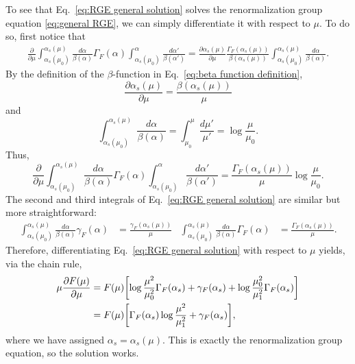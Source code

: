 \documentclass[12pt,twoside,class=../reedthesis, crop=false]{standalone}
\begin{document}
	To see that Eq.~\ref{eq:RGE general solution} solves the renormalization group equation \ref{eq:general RGE}, we can simply differentiate it with respect to $\mu$. To do so, first notice that
	\begin{equation}
	\begin{aligned}
		\frac{\partial}{\partial \mu} \int_{\alpha_s(\mu_0)}^{\alpha_s(\mu)} \frac{d\alpha}{\beta(\alpha)}\Gamma_F(\alpha) \int_{\alpha_s(\mu_0)}^\alpha \frac{d\alpha'}{\beta(\alpha')} = \frac{\partial \alpha_s(\mu)}{\partial \mu} \frac{\Gamma_F(\alpha_s(\mu))}{\beta(\alpha_s(\mu))} \int_{\alpha_s(\mu_0)}^{\alpha_s(\mu)} \frac{d\alpha}{\beta(\alpha)}.
	\end{aligned}
	\end{equation}
	By the definition of the $\beta$-function in Eq.~\ref{eq:beta function definition},
	\begin{equation}
		\frac{\partial \alpha_s(\mu)}{\partial \mu} = \frac{\beta(\alpha_s(\mu))}{\mu}
	\end{equation}
	and
	\begin{equation}
		\int_{\alpha_s(\mu_0)}^{\alpha_s(\mu)} \frac{d\alpha}{\beta(\alpha)} = \int_{\mu_0}^\mu \frac{d\mu'}{\mu'} = \log\frac{\mu}{\mu_0}.
	\end{equation}
	Thus,
	\begin{equation}
		\frac{\partial}{\partial \mu} \int_{\alpha_s(\mu_0)}^{\alpha_s(\mu)} \frac{d\alpha}{\beta(\alpha)}\Gamma_F(\alpha) \int_{\alpha_s(\mu_0)}^\alpha \frac{d\alpha'}{\beta(\alpha')} = \frac{\Gamma_F(\alpha_s(\mu))}{\mu} \log \frac{\mu}{\mu_0}.
	\end{equation}
	The second and third integrals of Eq.~\ref{eq:RGE general solution} are similar but more straightforward:
	\begin{align}
		\int_{\alpha_s(\mu_0)}^{\alpha_s(\mu)} \frac{d\alpha}{\beta(\alpha)}\gamma_F(\alpha) &= \frac{\gamma_F(\alpha_s(\mu))}{\mu} & \int_{\alpha_s(\mu_0)}^{\alpha_s(\mu)} \frac{d\alpha}{\beta(\alpha)}\Gamma_F(\alpha) &= \frac{\Gamma_F(\alpha_s(\mu))}{\mu}.
	\end{align}
	Therefore, differentiating Eq.~\ref{eq:RGE general solution} with respect to $\mu$ yields, via the chain rule,
	\begin{equation}
	\begin{aligned}
		\mu \frac{\partial F(\mu)}{\partial \mu} &= F(\mu) \qty[\log\frac{\mu^2}{\mu_0^2} \Gamma_F(\alpha_s) + \gamma_F(\alpha_s) + \log\frac{\mu_0^2}{\mu_1^2}\Gamma_F(\alpha_s)] \\
		&= F(\mu) \qty[\Gamma_F(\alpha_s)\log\frac{\mu^2}{\mu_1^2} + \gamma_F(\alpha_s)],
	\end{aligned}
	\end{equation}
	where we have assigned $\alpha_s = \alpha_s(\mu)$. This is exactly the renormalization group equation, so the solution works.
\end{document}
